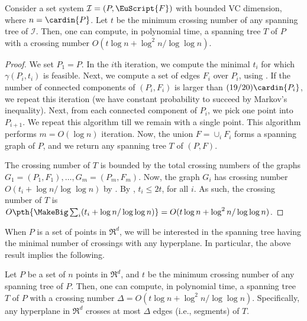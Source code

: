 \documentclass[12pt]{article}
\newcommand{\PntSet}{P}
\newcommand{\Term}[1]{\textsf{#1}}
\newcommand{\VC}{\Term{V{C}}\xspace}
\newcommand{\Family}{\EuScript{F}}
\newcommand{\I}{\mathcal{I}}
\begin{document}
\begin{theorem}
    Consider a set system $\I = (\PntSet, \Family)$ with bounded \VC
    dimension, where $n = \cardin{\PntSet}$.  Let $t$ be the minimum
    crossing number of any spanning tree of $\I$.  Then, one can
    compute, in polynomial time, a spanning tree $T$ of $\PntSet$ with
    a crossing number $O(t \log n + \log^2 n / \log \log n )$.

\end{theorem}
\begin{proof}
    We set $\PntSet_1 = \PntSet$. In the $i$th iteration, we compute
    the minimal $t_i$ for which $\gamma(\PntSet_i,t_i)$ is
    feasible. Next, we compute a set of edges $F_i$ over $\PntSet_i$,
    using . If the number of connected components of
    $(\PntSet_i, F_i)$ is larger than $(19/20) \cardin{\PntSet_i}$, we
    repeat this iteration (we have constant probability to succeed by
    Markov's inequality). Next, from each connected component of
    $\PntSet_i$, we pick one point into $\PntSet_{i+1}$. We repeat
    this algorithm till we remain with a single point. This algorithm
    performs $m = O( \log n)$ iteration.  Now, the union $F = \cup_i
    F_i$ forms a spanning graph of $\PntSet$, and we return any
    spanning tree $T$ of $(\PntSet,F)$.


    The crossing number of $T$ is bounded by the total crossing
    numbers of the graphs $G_1 = (\PntSet_1, F_1), \ldots, G_m =
    (\PntSet_m, F_m)$. Now, the graph $G_i$ has crossing number $O(
    t_i + \log n / \log \log n)$ by . By
    , $t_i \leq 2t$, for all $i$. As such, the
    crossing number of $T$ is $O\pth{ \MakeBig \sum_i ( t_i + \log n
       /\log \log n ) } = O(t \log n + \log^2 n / \log \log n)$.
\end{proof}

\medskip

When $\PntSet$ is a set of points in $\Re^d$, we will be interested in
the spanning tree having the minimal number of crossings with any
hyperplane. In particular, the above result implies the following.

\begin{corollary}
    Let $\PntSet$ be a set of $n$ points in $\Re^d$, and $t$ be the
    minimum crossing number of any spanning tree of $\PntSet$.  Then,
    one can compute, in polynomial time, a spanning tree $T$ of
    $\PntSet$ with a crossing number $\Delta = O(t \log n + \log^2 n
    /\log \log n )$.  Specifically, any hyperplane in $\Re^d$ crosses
    at most $\Delta$ edges (i.e., segments) of $T$.

\end{corollary}
\end{document}
